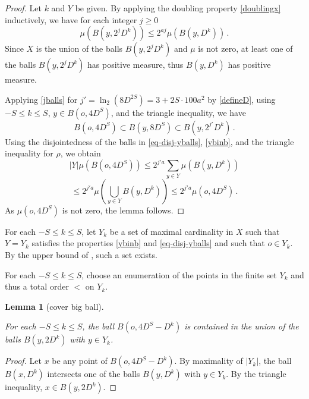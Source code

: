 \documentclass[10pt,a4paper]{article}
\theoremstyle{plain}
\newtheorem{lemma}[theorem]{Lemma}
\theoremstyle{definition}
\numberwithin{equation}{subsection}
\newcommand{\lean}[1]{}
\newcommand{\leanok}{}
\begin{document}
\begin{proof}
    \leanok
Let $k$ and $Y$ be given. By applying the doubling property \eqref{doublingx} inductively, we have for each integer $j\ge 0$
\begin{equation}\label{jballs}
    \mu(B(y,2^{j}D^k))\le 2^{aj} \mu(B(y,D^k))\, .
\end{equation}
Since $X$ is the union of the balls $B(y,2^{j}D^k)$ and $\mu$ is not zero, at least one of the balls $B(y,2^{j}D^k)$ has positive measure, thus $B(y,D^k)$ has positive measure.

Applying \eqref{jballs} for $j' = \ln_2(8D^{2S}) = 3 + 2S \cdot 100a^2$ by \eqref{defineD}, using $-S\le k\le S$, $y\in B(o,4D^S)$, and the triangle inequality, we have
\begin{equation}
    B(o, 4D^S) \subset B(y, 8D^S) \subset B(y,2^{j'}D^k) \, .
\end{equation}
Using the disjointedness of the balls in \eqref{eq-disj-yballs}, \eqref{ybinb}, and the triangle inequality for $\rho$, we obtain
\begin{equation}
|Y|\mu(B(o,4D^S))\le 2^{j'a}\sum_{y\in Y}\mu(B(y,D^k))
\end{equation}
\begin{equation}
\le
2^{j'a}\mu(\bigcup_{y\in Y}B(y,D^k))
\le 2^{j'a}\mu(o,4D^S)\, .
\end{equation}
As $\mu(o,4D^S)$ is not zero, the lemma follows.
\end{proof}

For each $-S\le k\le S$, let $Y_k$ be a set of
maximal cardinality in $X$ such that $Y=Y_k$ satisfies
the properties \eqref{ybinb} and \eqref{eq-disj-yballs} and such that $o \in Y_k$.
By the upper bound of , such a set exists.

For each $-S\le k\le S$, choose an enumeration of the points in the finite set $Y_k$ and thus a total
order $<$ on $Y_{k}$.

\begin{lemma}[cover big ball]
    \label{cover-big-ball}
    \leanok
    \lean{cover_big_ball}
    For each $-S\le k\le S$, the ball
    $B(o, 4D^S-D^k)$ is contained
    in the union of the balls $B(y,2D^k)$ with $y\in Y_k$.
\end{lemma}

\begin{proof}
\leanok
Let $x$ be any point of $B(o, 4D^S-D^k)$. By maximality of $|Y_k|$, the ball
$B(x, D^k)$ intersects one of the balls
$B(y, D^k)$ with $y\in Y_k$. By the triangle
inequality, $x\in B(y,2D^k)$.
\end{proof}
\end{document}
